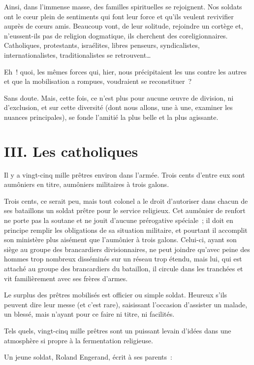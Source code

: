 \documentclass[french,twoside]{book} %
\newcommand\chapteropen{} %
\newcommand\chaptercont{} %
\newcommand\chapterclose{} %
\begin{document}
Ainsi, dans l’immense masse, des familles spirituelles se rejoignent. Nos soldats ont le cœur plein de sentiments qui font leur force et qu’ils veulent revivifier auprès de cœurs amis. Beaucoup vont, de leur solitude, rejoindre un cortège et, n’eussent-ils pas de religion dogmatique, ils cherchent des coreligionnaires. Catholiques, protestants, israélites, libres penseurs, syndicalistes, internationalistes, traditionalistes se retrouvent…‌\par
Eh ! quoi, les mêmes forces qui, hier, nous précipitaient les uns contre les autres et que la mobilisation a rompues, voudraient se reconstituer ?‌\par
Sans doute. Mais, cette fois, ce n’est plus pour aucune œuvre de division, ni d’exclusion, et sur cette diversité (dont nous allons, une à une, examiner les nuances principales), se fonde l’amitié la plus belle et la plus agissante.‌
\chapterclose


\chapteropen
\chapter[{III. Les catholiques}]{III. Les catholiques}\renewcommand{\leftmark}{III. Les catholiques}


\chaptercont
\noindent Il y a vingt-cinq mille prêtres environ dans l’armée. Trois cents d’entre eux sont aumôniers en titre, aumôniers militaires à trois galons.‌\par
Trois cents, ce serait peu, mais tout colonel a le droit d’autoriser dans chacun de ses bataillons un soldat prêtre pour le service religieux. Cet aumônier de renfort ne porte pas la soutane et ne jouit d’aucune prérogative spéciale ; il doit en principe remplir les obligations de sa situation militaire, et pourtant il accomplit son ministère plus aisément que l’aumônier à trois galons. Celui-ci, ayant son siège au groupe des brancardiers divisionnaires, ne peut joindre qu’avec peine des hommes trop nombreux disséminés sur un réseau trop étendu, mais lui, qui est attaché au groupe des brancardiers du bataillon, il circule dans les tranchées et vit familièrement avec ses frères d’armes.‌\par
Le surplus des prêtres mobilisés est officier ou simple soldat. Heureux s’ils peuvent dire leur messe (et c’est rare), saisissant l’occasion d’assister un malade, un blessé, mais n’ayant pour ce faire ni titre, ni facilités.‌\par
Tels quels, vingt-cinq mille prêtres sont un puissant levain d’idées dans une atmosphère si propre à la fermentation religieuse.‌\par
Un jeune soldat, Roland Engerand, écrit à ses parents :\par
\end{document}
